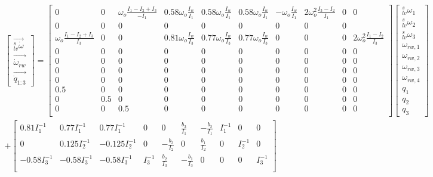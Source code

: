 \tiny
\begin{align}
\begin{bmatrix}
\vec{_{lv}^s\dot{\omega}} \\
\vec{\dot{\omega}_{rw} } \\
\vec{\dot{q}_{1:3}}
\end{bmatrix} 
 \nonumber
= \begin{bmatrix}
0 & 0 & \omega_o\frac{I_1 - I_2 + I_3}{-I_1} & 0.58\omega_o\frac{I_w}{I_1} & 0.58\omega_o\frac{I_w}{I_1} & 0.58\omega_o\frac{I_w}{I_1} & -\omega_o\frac{I_w}{I_1} & 2\omega_o^2\frac{I_3 - I_2}{I_1} & 0 & 0 \\
0 & 0 &	0 & 0 & 0 &	0 & 0 &  0 & 0\\
 \omega_o\frac{I_1 - I_2 + I_3}{I_3}  & 0 & 0 &  0.81\omega_o\frac{I_w}{I_3} & 0.77\omega_o\frac{I_w}{I_3} & 0.77\omega_o\frac{I_w}{I_3} &	0 & 0 & 0 & 2\omega_o^2\frac{I_1 - I_2}{I_3}\\
0 & 0 &	0  & 0 & 0 & 0 & 0 & 0 & 0& 0\\
0 & 0 &	0  & 0 & 0 & 0 & 0 & 0 & 0& 0 \\
0 & 0 &	0 & 0 & 0 & 0 & 0 & 0 & 0& 0\\
0 & 0 &	0 & 0 & 0 & 0 & 0 & 0 & 0& 0\\
0.5 & 0 &	0 & 0 & 0 & 0 & 0 & 0 & 0& 0 \\
0 & 0.5 &	0& 0 & 0 & 0 & 0 & 0 & 0& 0 \\
0 & 0 &	0.5 & 0 & 0 & 0 & 0 & 0 & 0& 0\\
\end{bmatrix}
\begin{bmatrix}
_{lv}^s\omega_1 \\
_{lv}^s\omega_2 \\
_{lv}^s\omega_3 \\
\omega_{rw,1} \\
\omega_{rw,2} \\
\omega_{rw,3} \\
\omega_{rw,4} \\
q_1 \\
q_2 \\
q_3 
\end{bmatrix}
 \\
 \nonumber
+
\begin{bmatrix}
0.81I_1^{-1} & 0.77I_1^{-1} & 0.77I_1^{-1} & 0 & 0 & \frac{b_3}{I_1} & -\frac{b_2}{I_1}	& I_1^{-1} & 0 & 0\\
0 & 0.125I_2^{-1} & -0.125I_2^{-1} & 0 & - \frac{b_3}{I_2} & 0 &  \frac{b_1}{I_2} & 0 & I_2^{-1} & 0\\ 
-0.58I_3^{-1} & -0.58 I_3^{-1} & -0.58 I_3^{-1} & I_3^{-1} &  \frac{b_2}{I_3} &  -\frac{b_1}{I_3} & 0 & 0 & 0 & I_3^{-1} \\  

\end{bmatrix}
\end{align}
